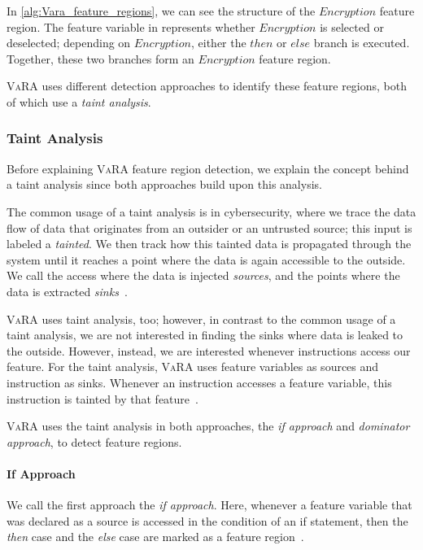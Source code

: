 In \autoref{alg:Vara_feature_regions}, we can see the structure of the $Encryption$ feature region. 
The feature variable in  represents whether $Encryption$ is selected or deselected; depending on $Encryption$, 
either the $then$ or $else$ branch is executed. 
Together, these two branches form an $Encryption$ feature region.

\textsc{VaRA} uses different detection approaches to identify these feature regions, both of which use a \emph{taint analysis}.

\subsubsection{Taint Analysis}
Before explaining \textsc{VaRA} feature region detection, we explain the concept behind a taint analysis since both approaches build upon this analysis.

The common usage of a taint analysis is in cybersecurity, where we trace the data flow of data that originates from an outsider or an untrusted source; 
this input is labeled a \emph{tainted}. 
We then track how this tainted data is propagated through the system until it reaches a point where the data is again accessible to the outside. 
We call the access where the data is injected \emph{sources}, and the points where the data is extracted \emph{sinks}~\cite{TaintAnalysis}.

\textsc{VaRA} uses taint analysis, too; however, in contrast to the common usage of a taint analysis, 
we are not interested in finding the sinks where data is leaked to the outside. However, instead, we are interested whenever instructions access our feature. 
For the taint analysis, \textsc{VaRA} uses feature variables as sources and instruction as sinks. Whenever an instruction accesses a feature variable, 
this instruction is tainted by that feature~\cite{VaRA-Janik}.

\textsc{VaRA} uses the taint analysis in both approaches, the \emph{if approach} and \emph{dominator approach}, to detect feature regions.

\paragraph{If Approach}
We call the first approach the \emph{if approach}. Here, whenever a feature variable that was declared as a source is accessed in the condition of an if statement, 
then the \emph{then} case and the \emph{else} case are marked as a feature region~\cite{VaRA-Tom}.

